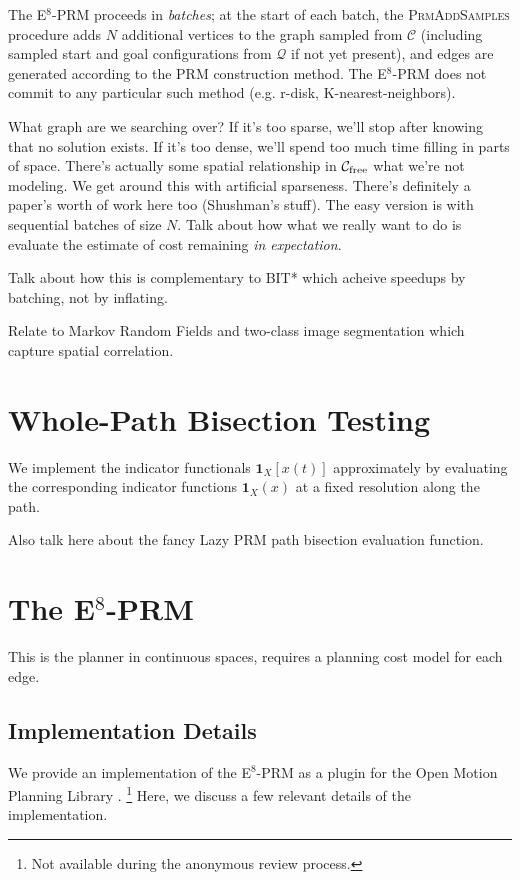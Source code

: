 The E$^8$-PRM proceeds in \emph{batches};
at the start of each batch,
the \textsc{PrmAddSamples} procedure adds
$N$ additional vertices to the graph sampled from $\mathcal{C}$
(including sampled start and goal configurations from $\mathcal{Q}$
if not yet present),
and edges are generated according to the PRM construction method.
The E$^8$-PRM does not commit to any particular such method
(e.g. r-disk, K-nearest-neighbors).

What graph are we searching over?
If it's too sparse, we'll stop after knowing that no solution exists.
If it's too dense, we'll spend too much time filling in parts of
space.
There's actually some spatial relationship in
$\mathcal{C}_{\mbox{\scriptsize free}}$ what we're not
modeling.
We get around this with artificial sparseness.
There's definitely a paper's worth of work here too (Shushman's stuff).
The easy version is with sequential batches of size $N$.
Talk about how what we really want to do
is evaluate the estimate of cost remaining
\emph{in expectation}.

Talk about how this is complementary to BIT* which acheive speedups
by batching, not by inflating.

Relate to Markov Random Fields and two-class image segmentation
which capture spatial correlation.

\section{Whole-Path Bisection Testing}

We implement the indicator functionals $\mathbf{1}_X[x(t)]$
approximately by evaluating the corresponding indicator functions
$\mathbf{1}_X(x)$ at a fixed resolution along the path.

Also talk here about the fancy Lazy PRM path bisection
evaluation function.

\section{The E$^8$-PRM}

This is the planner in continuous spaces,
requires a planning cost model for each edge.

\subsection{Implementation Details}
\label{subsec:implementation-details}

We provide an implementation of the E$^8$-PRM
as a plugin for the Open Motion Planning Library \cite{sucan2012ompl}.%
\footnote{Not available during the anonymous review process.}
Here, we discuss a few relevant details of the implementation.

